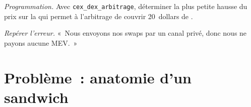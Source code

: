 \begin{exercise}[$\star\star\star$]\label{exo:m3:maximal-extractable-value:7}
\emph{Programmation.} Avec \texttt{cex\_dex\_arbitrage}, déterminer la plus petite hausse du prix sur la  qui permet à l'arbitrage de couvrir 20~dollars de .
\end{exercise}

\begin{exercise}[$\star\star\star$]\label{exo:m3:maximal-extractable-value:8}
\emph{Repérer l'erreur.} «~Nous envoyons nos swaps par un canal privé, donc nous ne payons aucune MEV.~»
\end{exercise}

\section{Problème~: anatomie d'un sandwich}

